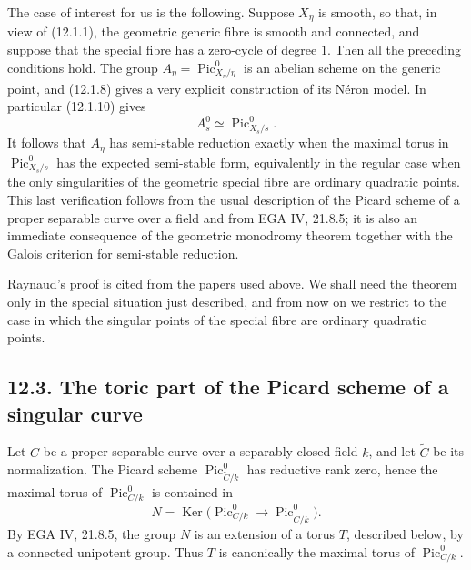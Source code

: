 \documentclass[11pt]{article}
\providecommand{\Pic}{\operatorname{Pic}}
\providecommand{\Ker}{\operatorname{Ker}}
\begin{document}
The case of interest for us is the following.  Suppose \(X_\eta\) is smooth, so that, in view of (12.1.1), the geometric generic fibre is smooth and connected, and suppose that the special fibre has a zero-cycle of degree \(1\).  Then all the preceding conditions hold.  The group \(A_\eta=\Pic^0_{X_\eta/\eta}\) is an abelian scheme on the generic point, and (12.1.8) gives a very explicit construction of its N\'eron model.  In particular (12.1.10) gives
\begin{equation}\tag{12.1.12}
        A^0_s\simeq \Pic^0_{X_s/s}.
\end{equation}
It follows that \(A_\eta\) has semi-stable reduction exactly when the maximal torus in \(\Pic^0_{X_s/s}\) has the expected semi-stable form, equivalently in the regular case when the only singularities of the geometric special fibre are ordinary quadratic points.  This last verification follows from the usual description of the Picard scheme of a proper separable curve over a field and from EGA IV, 21.8.5; it is also an immediate consequence of the geometric monodromy theorem together with the Galois criterion for semi-stable reduction.

Raynaud's proof is cited from the papers used above.  We shall need the theorem only in the special situation just described, and from now on we restrict to the case in which the singular points of the special fibre are ordinary quadratic points.

\subsection*{12.3. The toric part of the Picard scheme of a singular curve}

Let \(C\) be a proper separable curve over a separably closed field \(k\), and let \(\widetilde C\) be its normalization.  The Picard scheme \(\Pic^0_{\widetilde C/k}\) has reductive rank zero, hence the maximal torus of \(\Pic^0_{C/k}\) is contained in
\[
        N=\Ker\bigl(\Pic^0_{C/k}\longrightarrow \Pic^0_{\widetilde C/k}\bigr).
\]
By EGA IV, 21.8.5, the group \(N\) is an extension of a torus \(T\), described below, by a connected unipotent group.  Thus \(T\) is canonically the maximal torus of \(\Pic^0_{C/k}\).
\end{document}
